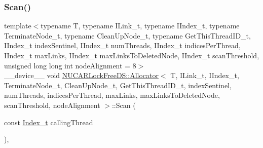 \subsubsection{\texorpdfstring{Scan()}{Scan()}}
{\footnotesize\ttfamily template$<$typename T, typename I\+Link\+\_\+t, typename I\+Index\+\_\+t, typename Terminate\+Node\+\_\+t, typename Clean\+Up\+Node\+\_\+t, typename Get\+This\+Thread\+I\+D\+\_\+t, I\+Index\+\_\+t index\+Sentinel, I\+Index\+\_\+t num\+Threads, I\+Index\+\_\+t indices\+Per\+Thread, I\+Index\+\_\+t max\+Links, I\+Index\+\_\+t max\+Links\+To\+Deleted\+Node, I\+Index\+\_\+t scan\+Threshold, unsigned long long int node\+Alignment = 8$>$ \\
\+\_\+\+\_\+device\+\_\+\+\_\+ void \mbox{\hyperlink{class_n_u_c_a_r_lock_free_d_s_1_1_allocator}{N\+U\+C\+A\+R\+Lock\+Free\+D\+S\+::\+Allocator}}$<$ T, I\+Link\+\_\+t, I\+Index\+\_\+t, Terminate\+Node\+\_\+t, Clean\+Up\+Node\+\_\+t, Get\+This\+Thread\+I\+D\+\_\+t, index\+Sentinel, num\+Threads, indices\+Per\+Thread, max\+Links, max\+Links\+To\+Deleted\+Node, scan\+Threshold, node\+Alignment $>$\+::Scan (\begin{DoxyParamCaption}\item[{const \mbox{\hyperlink{class_n_u_c_a_r_lock_free_d_s_1_1_allocator_a2776cca35e8343bf5007bd8b6f3a3f8f}{Index\+\_\+t}}}]{calling\+Thread }\end{DoxyParamCaption})\hspace{0.3cm}{\ttfamily [inline]}, {\ttfamily [private]}}

\mbox{\label{class_n_u_c_a_r_lock_free_d_s_1_1_allocator_a08cd8b51995e5cebbc937a3a01aa1eff}} 
